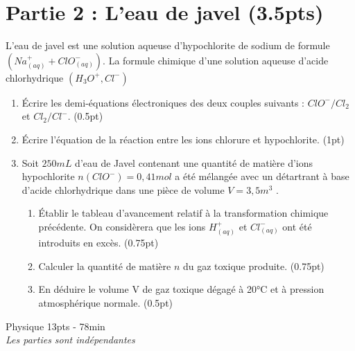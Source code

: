 \documentclass[12pt]{article}
\begin{document}
\section*{Partie 2 : L’eau de javel \dotfill(3.5pts) }

L’eau de javel est une solution aqueuse d’hypochlorite de sodium de formule $(Na^+_{(aq)} + ClO^-_{(aq)} )$.
La formule chimique d’une solution aqueuse d’acide chlorhydrique $(H_3O^+,Cl^-)$
\begin{enumerate}
  \item Écrire les demi-équations électroniques des deux couples suivants : $ClO^-/Cl_2$ et $Cl_2 /Cl^-$. \dotfill(0.5pt)
    
  \item  Écrire l’équation de la réaction entre les ions chlorure et hypochlorite. \dotfill(1pt)
  
  \item Soit $250mL$ d’eau de Javel contenant une quantité de matière d’ions hypochlorite $n(ClO^-)=0,41mol$ a été mélangée avec un détartrant à base d’acide chlorhydrique dans une pièce de volume $V=3,5 m^3$ .
    \begin{enumerate}
 \item Établir le tableau d’avancement relatif à la transformation chimique précédente. On considèrera que les ions $H^+_{(aq)}$ et $Cl^-_{(aq)}$ ont été introduits en excès. \dotfill(0.75pt)

 \item Calculer la quantité de matière $n$ du gaz toxique produite. \dotfill(0.75pt)
 \item En déduire le volume V de gaz toxique dégagé à 20°C et à pression atmosphérique normale. \dotfill(0.5pt)
   \end{enumerate}
\end{enumerate}

\begin{center}
    \vspace{2cm}
\hrulefill
\Large{Physique 13pts - 78min}
\hrulefill\\
    \emph{Les parties sont indépendantes}
\end{center}
\end{document}
